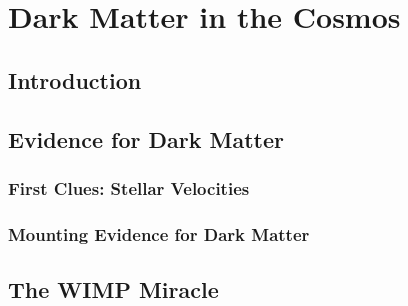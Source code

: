\documentclass[a4paper, 12pt]{article}
\begin{document}
\section{Dark Matter in the Cosmos\label{sec:dm_cosmos}}

\subsection{Introduction\label{sec:intro2dm}}

\subsection{Evidence for Dark Matter\label{sec:evidence4dm}}

\subsubsection{First Clues: Stellar Velocities\label{sec:ev4dm_stars}}

\subsubsection{Mounting Evidence for Dark Matter\label{secc:ev4dm_more}}

\subsection{The WIMP Miracle\label{sec:dm_wimps}}

\end{document}
